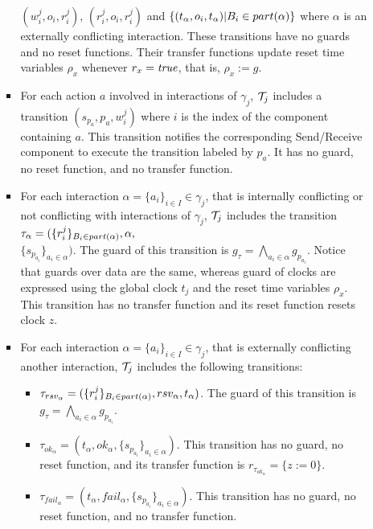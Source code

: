\begin{definition}[Scheduler]
\begin{itemize}
\begin{itemize}
\begin{itemize}
              $(w_i^j,o_i,r_i^j)$, $(r_i^j,o_i,r_i^j)$ and $\{(t_{\alpha},o_i,t_{\alpha})|
              B_i\in part(\alpha)\}$ where $\alpha$ is an externally conflicting interaction.
              These transitions have no guards and no reset functions. 
              Their transfer functions update reset time 
              variables $\rho_x$ whenever $r_x=\textnormal{\textit{true}}$, that is, $\rho_x:=g$. 
            \item For each action $a$ involved in interactions of $\gamma_j$, $\mathcal{T}_j$ includes
              a transition $(s_{p_a},p_a,w_i^j)$ where $i$ is the index of the component
              containing $a$. This transition notifies the corresponding Send/Receive component 
              to execute the transition labeled by $p_a$. It has no guard, no reset function,
              and no transfer function.
            \item For each interaction $\alpha=\{a_i\}_{i\in{I}}\in\gamma_j$, that is 
              internally conflicting or not conflicting with interactions of $\gamma_j$,
              $\mathcal{T}_j$ includes the transition $\tau_{\alpha}=(\{r_i^j\}_{B_i\in part(\alpha)},
              \alpha,$\\$\{s_{p_{a_i}}\}_{a_i\in\alpha})$. The guard of this transition is 
              $g_{\tau}=
              \bigwedge_{a_i\in\alpha}g_{p_{a_i}}$. Notice that guards over data are the same,
              whereas guard of clocks are expressed using the global clock $t_j$ and the reset
              time variables $\rho_x$. This transition has no transfer function 
              and its reset function resets clock $z$.
            \item For each interaction $\alpha=\{a_i\}_{i\in{I}}\in\gamma_j$, that is 
              externally conflicting another interaction,
              $\mathcal{T}_j$ includes the following transitions:
              \begin{itemize}
                \item $\tau_{rsv_{\alpha}}=(\{r_i^j\}_{B_i\in part(\alpha)},rsv_{\alpha},t_{\alpha}
                  )$. The guard of this transition is $g_{\tau}=\bigwedge_{a_i\in\alpha}
                  g_{p_{a_i}}$.
                \item $\tau_{ok_{\alpha}}=(t_{\alpha},ok_{\alpha},\{s_{p_{a_i}}\}_{a_i\in\alpha})
                  $. This transition has no guard, no reset function, and its transfer function is
                   $r_{\tau_{ok_{\alpha}}}=\{z:=0\}$.
                \item $\tau_{fail_{\alpha}}=(t_{\alpha},fail_{\alpha},\{s_{p_{a_i}}\}_{a_i
                  \in\alpha})$. This transition has no guard, no reset function, and no 
                  transfer function.
              \end{itemize}
          \end{itemize}
      \end{itemize}
  \end{itemize}
\end{definition}
